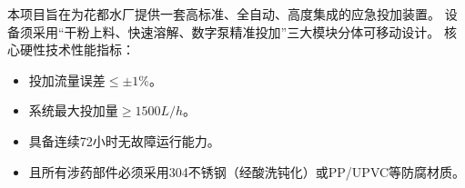 
%
%  
%
%

本项目旨在为花都水厂提供一套高标准、全自动、高度集成的应急投加装置。
设备须采用“干粉上料、快速溶解、数字泵精准投加”三大模块分体可移动设计。
核心硬性技术性能指标：
\begin{itemize}
    \item 投加流量误差$\le \pm 1 \%$。
    \item 系统最大投加量$\ge 1500L/h$。
    \item 具备连续72小时无故障运行能力。
    \item 且所有涉药部件必须采用304不锈钢（经酸洗钝化）或PP/UPVC等防腐材质。
\end{itemize}

